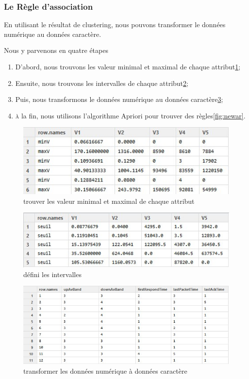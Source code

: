 \subsubsection{Le Règle d'association}
En utilisant le résultat de clustering, nous pouvons transformer le données numérique au données caractère. 

Nous y parvenons en quatre étapes
\begin{enumerate}
\item D'abord, nous trouvons les valeur minimal et maximal de chaque attribut\ref{fig:max-min1};
\item Ensuite, nous trouvons les intervalles de chaque attribut\ref{fig:seuil};
\item Puis, nous transformons le données numérique au données caractère\ref{fig:newData2};
\item \textsc{à} la fin, nous utilisons l'algorithme Apriori pour trouver des règles\ref{fig:newar}. 
\end{enumerate}
\begin{figure}[H]
\centering
\includegraphics[width=0.8\linewidth]{images/max-min1}
\caption{trouver les valeur minimal et maximal de chaque attribut}
\label{fig:max-min1}
\end{figure}


\begin{figure}[H]
\centering
\includegraphics[width=0.8\linewidth]{images/seuil}
\caption{défini les intervalles}
\label{fig:seuil}
\end{figure}

\begin{figure}[H]
\centering
\includegraphics[width=0.8\linewidth]{images/newData2}
\caption{transformer les données numérique à données caractère}
\label{fig:newData2}
\end{figure}

